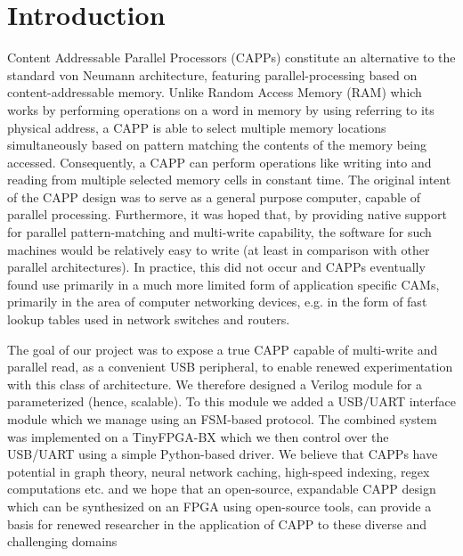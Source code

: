 \section{Introduction}
Content Addressable Parallel Processors (CAPPs) constitute an alternative to the standard von Neumann architecture, featuring parallel-processing based on content-addressable memory. Unlike Random Access Memory (RAM) which works by performing operations on a word in memory by using referring to its physical address, a CAPP is able to select multiple memory locations simultaneously based on pattern matching the contents of the memory being accessed. Consequently, a CAPP can perform operations like writing into and reading from multiple selected memory cells in constant time. The original intent of the CAPP design was to serve as a general purpose computer, capable of parallel processing. Furthermore, it was hoped that, by providing native support for parallel pattern-matching and multi-write capability, the software for such machines would be relatively easy to write (at least in comparison with other parallel architectures). In practice, this did not occur and CAPPs eventually found use primarily in a much more limited form of application specific CAMs, primarily in the area of computer networking devices, e.g. in the form of fast lookup tables used in network switches and routers.

The goal of our project was to expose a true CAPP capable of multi-write and parallel read, as a convenient USB peripheral, to enable renewed experimentation with this class of architecture. We therefore designed a Verilog module for a parameterized (hence, scalable). To this module we added a USB/UART interface module which we manage using an FSM-based protocol. The combined system was implemented on a TinyFPGA-BX which we then control over the USB/UART using a simple Python-based driver. We believe that CAPPs have potential in graph theory, neural network caching, high-speed indexing, regex computations etc. and we hope that an open-source, expandable CAPP design which can be synthesized on an FPGA using open-source tools, can provide a basis for renewed researcher in the application of CAPP to these diverse and challenging domains
